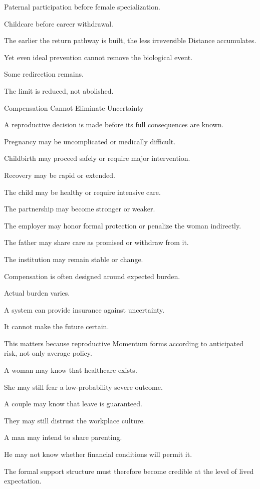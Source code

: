 Paternal participation before female specialization.

Childcare before career withdrawal.

The earlier the return pathway is built, the less irreversible Distance accumulates.

Yet even ideal prevention cannot remove the biological event.

Some redirection remains.

The limit is reduced, not abolished.

Compensation Cannot Eliminate Uncertainty

A reproductive decision is made before its full consequences are known.

Pregnancy may be uncomplicated or medically difficult.

Childbirth may proceed safely or require major intervention.

Recovery may be rapid or extended.

The child may be healthy or require intensive care.

The partnership may become stronger or weaker.

The employer may honor formal protection or penalize the woman indirectly.

The father may share care as promised or withdraw from it.

The institution may remain stable or change.

Compensation is often designed around expected burden.

Actual burden varies.

A system can provide insurance against uncertainty.

It cannot make the future certain.

This matters because reproductive Momentum forms according to anticipated risk, not only average policy.

A woman may know that healthcare exists.

She may still fear a low-probability severe outcome.

A couple may know that leave is guaranteed.

They may still distrust the workplace culture.

A man may intend to share parenting.

He may not know whether financial conditions will permit it.

The formal support structure must therefore become credible at the level of lived expectation.

